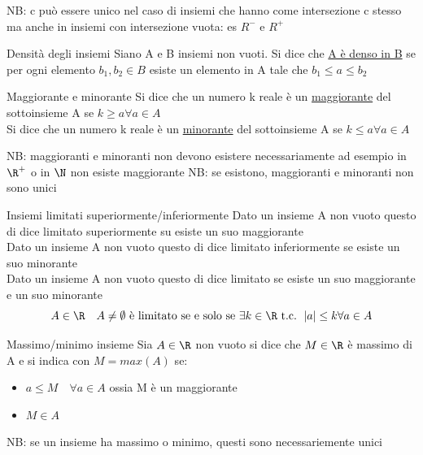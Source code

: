 NB: c può essere unico nel caso di insiemi che hanno come intersezione c stesso ma anche in insiemi con intersezione vuota: es $R^{-}$ e $R^{+}$
\begin{definizione}{Densità degli insiemi}
	Siano A e B insiemi non vuoti. Si dice che \underline{A è denso in B} se per ogni elemento $b_1, b_2  \in  B$ esiste un elemento in A tale che $b_1 \le a \le b_2$
\end{definizione}

\begin{definizione}{Maggiorante e minorante}
	Si dice che un numero k reale è un \underline{maggiorante} del sottoinsieme A se $k \ge a \forall a  \in  A$\\
	Si dice che un numero k reale è un \underline{minorante} del sottoinsieme A se $k \le a \forall a  \in  A$

\end{definizione}
NB: maggioranti e minoranti non devono esistere necessariamente ad esempio in $\R^{+}$ o in $ \N $ non esiste maggiorante
\vskip3mm
NB: se esistono, maggioranti e minoranti non sono unici

\begin{definizione}{Insiemi limitati superiormente/inferiormente}
	Dato un insieme A non vuoto questo di dice limitato superiormente su esiste un suo maggiorante\\
	Dato un insieme A non vuoto questo di dice limitato inferiormente se esiste un suo minorante\\
	Dato un insieme A non vuoto questo di dice limitato se esiste un suo maggiorante e un suo minorante \[
		A  \in \R \quad A \neq \emptyset \text{ è limitato se e solo se } \exists k  \in  \R \text{ t.c. } \left|a\right| \le k \forall a  \in  A
	\]

\end{definizione}

\begin{definizione}{Massimo/minimo insieme}
	Sia $ A  \in \R$ non vuoto si dice che $ M  \in \R$ è massimo di A e si indica con $M = max\left( A \right) $ se:
	\begin{itemize}
		\item $ a \le M \quad \forall a  \in  A $ ossia M è un maggiorante
		\item $ M  \in A$
	\end{itemize}
\end{definizione}
NB: se un insieme ha massimo o minimo, questi sono necessariemente unici


